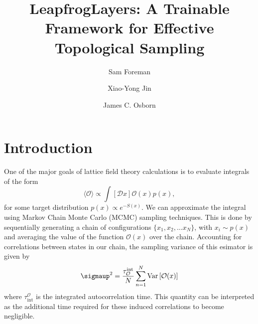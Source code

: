 \documentclass[a4paper,11pt]{article}
\title{LeapfrogLayers: A Trainable Framework for Effective Topological Sampling}
\author*[a]{Sam Foreman}
\author[a]{Xiao-Yong Jin}
\author[a]{James C. Osborn}
\affiliation[a]{Argonne National Laboratory,\\
  Lemont, IL}
\begin{document}
\maketitle


\section{\label{sec:intro}Introduction}
%
One of the major goals of lattice field theory calculations is to evaluate
integrals of the form
%
\begin{equation}
    \langle \mathcal{O} \rangle \propto \int \left[ \mathcal{D} x \right] \mathcal{O}(x) p(x),
    \label{eq:density_integral}
\end{equation}
%
for some target distribution \(p(x)\propto e^{-S(x)}\).
%
We can approximate the integral using Markov Chain Monte Carlo (MCMC) sampling
techniques.
%
This is done by sequentially generating a chain of configurations \(\{x_{1},
x_{2}, \ldots x_{N}\}\), with \(x_{i} \sim p(x)\) and averaging the value of
the function \(\mathcal{O}(x)\) over the chain.
%
Accounting for correlations between states in our chain, the sampling variance
of this esimator is given by
%
\begin{equation}
    \sigmaup^{2} = \frac{\tau_{\mathcal{O}}^{\mathrm{int}}}{N}\sum_{n=1}^{N} \mathrm{Var}\left[\mathcal{O}(x)\right]
\end{equation}
%
where \(\tau_{\mathrm{int}}^{\mathcal{O}}\) is the integrated autocorrelation
time.
%
This quantity can be interpreted as the additional time required for
these induced correlations to become negligible.
%
\end{document}
